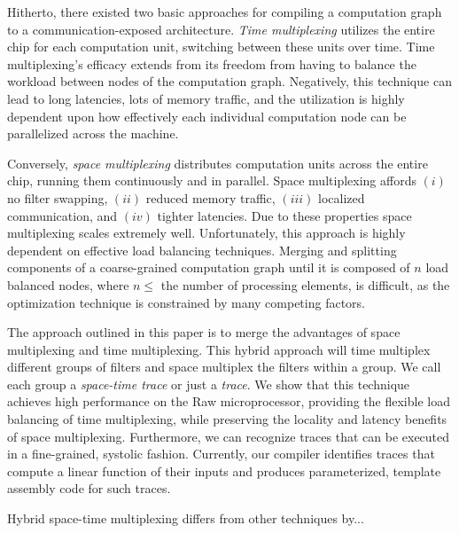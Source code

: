 Hitherto, there existed two basic approaches for compiling a
computation graph to a communication-exposed architecture.  
{\it Time multiplexing} utilizes the entire chip for each computation unit,
switching between these units over time.  Time multiplexing's efficacy
extends from its freedom from having to balance the workload between
nodes of the computation graph.  Negatively, this technique can lead
to long latencies, lots of memory traffic, and the utilization is
highly dependent upon how effectively each individual computation node
can be parallelized across the machine.

Conversely, {\it space multiplexing} distributes computation units
across the entire chip, running them continuously and in parallel.
Space multiplexing affords $(i)$ no filter swapping, $(ii)$ reduced
memory traffic, $(iii)$ localized communication, and $(iv)$ tighter
latencies.  Due to these properties space multiplexing scales
extremely well.  Unfortunately, this approach is highly dependent on
effective load balancing techniques.  Merging and splitting components
of a coarse-grained computation graph until it is composed of $n$ load
balanced nodes, where $n \le$ the number of processing elements, is
difficult, as the optimization technique is constrained by many
competing factors.

The approach outlined in this paper is to merge the advantages of
space multiplexing and time multiplexing.  This hybrid approach will
time multiplex different groups of filters and space multiplex the
filters within a group.  We call each group a {\it space-time trace}
or just a {\it trace}.  We show that this technique achieves high
performance on the Raw microprocessor, providing the flexible load
balancing of time multiplexing, while preserving the locality and
latency benefits of space multiplexing.  Furthermore, we can recognize
traces that can be executed in a fine-grained, systolic fashion.
Currently, our compiler identifies traces that compute a linear
function of their inputs and produces parameterized, template assembly
code for such traces.

Hybrid space-time multiplexing differs from other techniques by...

